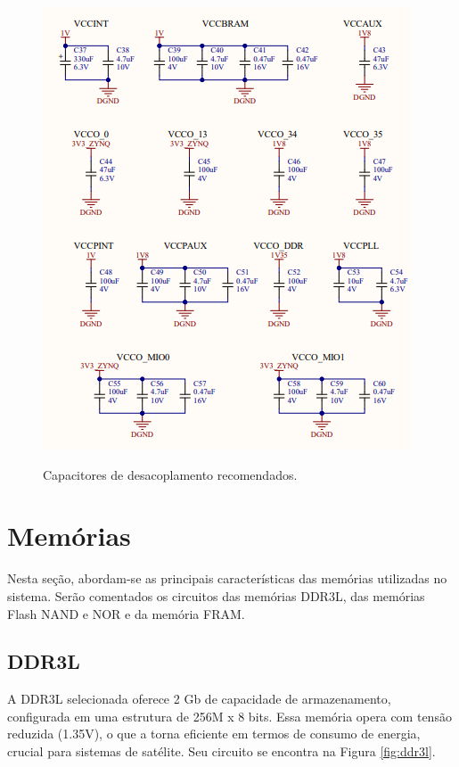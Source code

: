 \begin{figure}[H]
    \centering
    \caption{Capacitores de desacoplamento recomendados.}
    \includegraphics[scale=0.7]{images/zynqcaps.png}
    \label{fig:zcaps}
\end{figure}

\section{Memórias}

Nesta seção, abordam-se as principais características das memórias utilizadas no sistema. Serão comentados os circuitos das memórias DDR3L, das memórias Flash NAND e NOR e da memória FRAM.

\subsection{DDR3L} 

A DDR3L selecionada oferece 2 Gb de capacidade de armazenamento, configurada em uma estrutura de 256M x 8 bits. Essa memória opera com tensão reduzida (1.35V), o que a torna eficiente em termos de consumo de energia, crucial para sistemas de satélite. Seu circuito se encontra na Figura \ref{fig:ddr3l}. 

